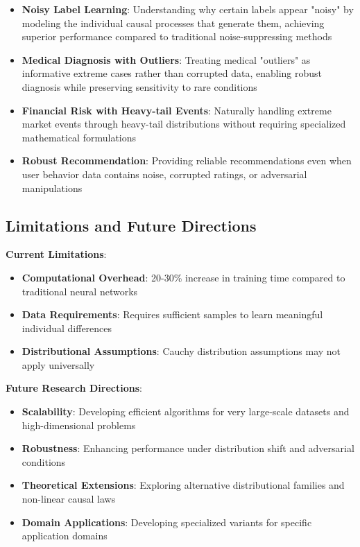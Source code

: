 \documentclass[conference]{IEEEtran}
\begin{document}
\begin{itemize}
\item \textbf{Noisy Label Learning}: Understanding why certain labels appear "noisy" by modeling the individual causal processes that generate them, achieving superior performance compared to traditional noise-suppressing methods
\item \textbf{Medical Diagnosis with Outliers}: Treating medical "outliers" as informative extreme cases rather than corrupted data, enabling robust diagnosis while preserving sensitivity to rare conditions
\item \textbf{Financial Risk with Heavy-tail Events}: Naturally handling extreme market events through heavy-tail distributions without requiring specialized mathematical formulations
\item \textbf{Robust Recommendation}: Providing reliable recommendations even when user behavior data contains noise, corrupted ratings, or adversarial manipulations
\end{itemize}

\subsection{Limitations and Future Directions}

\textbf{Current Limitations}:
\begin{itemize}
\item \textbf{Computational Overhead}: 20-30\% increase in training time compared to traditional neural networks
\item \textbf{Data Requirements}: Requires sufficient samples to learn meaningful individual differences
\item \textbf{Distributional Assumptions}: Cauchy distribution assumptions may not apply universally
\end{itemize}

\textbf{Future Research Directions}:
\begin{itemize}
\item \textbf{Scalability}: Developing efficient algorithms for very large-scale datasets and high-dimensional problems
\item \textbf{Robustness}: Enhancing performance under distribution shift and adversarial conditions
\item \textbf{Theoretical Extensions}: Exploring alternative distributional families and non-linear causal laws
\item \textbf{Domain Applications}: Developing specialized variants for specific application domains
\end{itemize}
\end{document}
